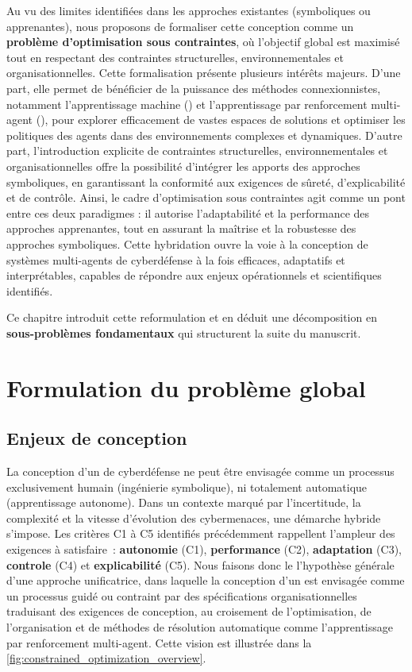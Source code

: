 Au vu des limites identifiées dans les approches existantes (symboliques ou apprenantes), nous proposons de formaliser cette conception comme un \textbf{problème d'optimisation sous contraintes}, où l'objectif global est maximisé tout en respectant des contraintes structurelles, environnementales et organisationnelles.
Cette formalisation présente plusieurs intérêts majeurs. D'une part, elle permet de bénéficier de la puissance des méthodes connexionnistes, notamment l'apprentissage machine () et l'apprentissage par renforcement multi-agent (), pour explorer efficacement de vastes espaces de solutions et optimiser les politiques des agents dans des environnements complexes et dynamiques. D'autre part, l'introduction explicite de contraintes structurelles, environnementales et organisationnelles offre la possibilité d'intégrer les apports des approches symboliques, en garantissant la conformité aux exigences de sûreté, d'explicabilité et de contrôle. Ainsi, le cadre d'optimisation sous contraintes agit comme un pont entre ces deux paradigmes : il autorise l'adaptabilité et la performance des approches apprenantes, tout en assurant la maîtrise et la robustesse des approches symboliques. Cette hybridation ouvre la voie à la conception de systèmes multi-agents de cyberdéfense à la fois efficaces, adaptatifs et interprétables, capables de répondre aux enjeux opérationnels et scientifiques identifiés.

Ce chapitre introduit cette reformulation et en déduit une décomposition en \textbf{sous-problèmes fondamentaux} qui structurent la suite du manuscrit.

\section{Formulation du problème global}

\subsection{Enjeux de conception}

La conception d'un  de cyberdéfense ne peut être envisagée comme un processus exclusivement humain (ingénierie symbolique), ni totalement automatique (apprentissage autonome). Dans un contexte marqué par l'incertitude, la complexité et la vitesse d'évolution des cybermenaces, une démarche hybride s'impose.
%
Les critères C1 à C5 identifiés précédemment rappellent l'ampleur des exigences à satisfaire~: \textbf{autonomie} (C1), \textbf{performance} (C2), \textbf{adaptation} (C3), \textbf{controle} (C4) et \textbf{explicabilité} (C5).
%
Nous faisons donc le l'hypothèse générale d'une approche unificatrice, dans laquelle la conception d'un  est envisagée comme un processus guidé ou contraint par des spécifications organisationnelles traduisant des exigences de conception, au croisement de l'optimisation, de l'organisation et de méthodes de résolution automatique comme l'apprentissage par renforcement multi-agent. Cette vision est illustrée dans la \autoref{fig:constrained_optimization_overview}.

